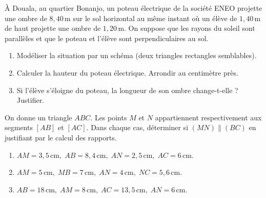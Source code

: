 \documentclass[11pt]{article}
\begin{document}
\begin{exercice}
À Douala, au quartier Bonanjo, un poteau électrique de la société ENEO projette une ombre de $8,40\,\text{m}$ sur le sol horizontal au même instant où un élève de $1,40\,\text{m}$ de haut projette une ombre de $1,20\,\text{m}$.
On suppose que les rayons du soleil sont parallèles et que le poteau et l'élève sont perpendiculaires au sol.
\begin{enumerate}
    \item Modéliser la situation par un schéma (deux triangles rectangles semblables).
    \item Calculer la hauteur du poteau électrique. Arrondir au centimètre près.
    \item Si l'élève s'éloigne du poteau, la longueur de son ombre change-t-elle ? Justifier.
\end{enumerate}
\end{exercice}

\begin{exercice}
On donne un triangle $ABC$. Les points $M$ et $N$ appartiennent respectivement aux segments $[AB]$ et $[AC]$.
Dans chaque cas, déterminer si $(MN) \parallel (BC)$ en justifiant par le calcul des rapports.
\begin{enumerate}
    \item $AM = 3,5\,\text{cm},\; AB = 8,4\,\text{cm},\; AN = 2,5\,\text{cm},\; AC = 6\,\text{cm}$.
    \item $AM = 5\,\text{cm},\; MB = 7\,\text{cm},\; AN = 4\,\text{cm},\; NC = 5,6\,\text{cm}$.
    \item $AB = 18\,\text{cm},\; AM = 8\,\text{cm},\; AC = 13,5\,\text{cm},\; AN = 6\,\text{cm}$.
\end{enumerate}
\end{exercice}
\end{document}
